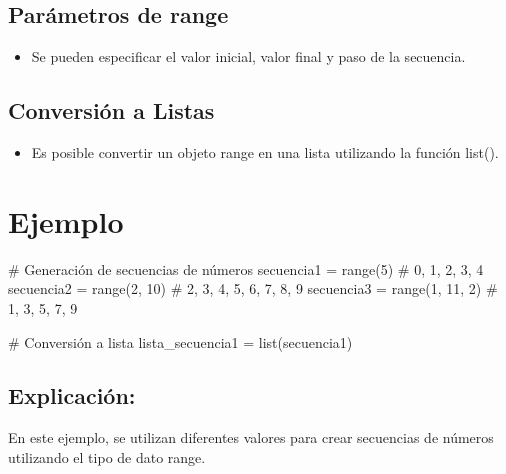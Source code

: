\documentclass[
  a4paper,
  DIV=11,
  numbers=noendperiod,
  onepage,
  openany]{scrreprt}
\newenvironment{Shaded}{\begin{snugshade}}{\end{snugshade}}
\newcommand{\BuiltInTok}[1]{\textcolor[rgb]{0.00,0.23,0.31}{#1}}
\newcommand{\CommentTok}[1]{\textcolor[rgb]{0.37,0.37,0.37}{#1}}
\newcommand{\DecValTok}[1]{\textcolor[rgb]{0.68,0.00,0.00}{#1}}
\newcommand{\NormalTok}[1]{\textcolor[rgb]{0.00,0.23,0.31}{#1}}
\newcommand{\OperatorTok}[1]{\textcolor[rgb]{0.37,0.37,0.37}{#1}}
\providecommand{\tightlist}{%
  \setlength{\itemsep}{0pt}\setlength{\parskip}{0pt}}\usepackage{longtable,booktabs,array}
\begin{document}
\subsection{Parámetros de range}\label{paruxe1metros-de-range}

\begin{itemize}
\tightlist
\item
  Se pueden especificar el valor inicial, valor final y paso de la
  secuencia.
\end{itemize}

\subsection{Conversión a Listas}\label{conversiuxf3n-a-listas}

\begin{itemize}
\tightlist
\item
  Es posible convertir un objeto range en una lista utilizando la
  función list().
\end{itemize}

\section{Ejemplo}\label{ejemplo-6}

\begin{Shaded}
\begin{Highlighting}[]
\CommentTok{\# Generación de secuencias de números}
\NormalTok{secuencia1 }\OperatorTok{=} \BuiltInTok{range}\NormalTok{(}\DecValTok{5}\NormalTok{)          }\CommentTok{\# 0, 1, 2, 3, 4}
\NormalTok{secuencia2 }\OperatorTok{=} \BuiltInTok{range}\NormalTok{(}\DecValTok{2}\NormalTok{, }\DecValTok{10}\NormalTok{)      }\CommentTok{\# 2, 3, 4, 5, 6, 7, 8, 9}
\NormalTok{secuencia3 }\OperatorTok{=} \BuiltInTok{range}\NormalTok{(}\DecValTok{1}\NormalTok{, }\DecValTok{11}\NormalTok{, }\DecValTok{2}\NormalTok{)   }\CommentTok{\# 1, 3, 5, 7, 9}

\CommentTok{\# Conversión a lista}
\NormalTok{lista\_secuencia1 }\OperatorTok{=} \BuiltInTok{list}\NormalTok{(secuencia1)}
\end{Highlighting}
\end{Shaded}

\subsection{Explicación:}\label{explicaciuxf3n-14}

En este ejemplo, se utilizan diferentes valores para crear secuencias de
números utilizando el tipo de dato range.
\end{document}
